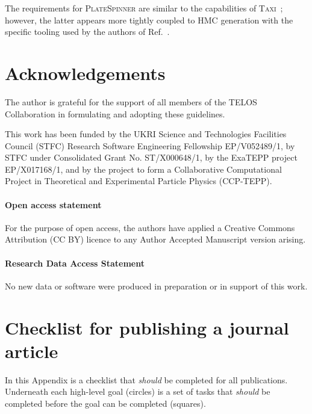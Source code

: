 \documentclass{article}
\newcommand\rfcword[1]{\emph{#1}\xspace}
\newcommand\should{\rfcword{should}}
\newcommand\program[1]{\textsc{#1}\xspace}
\begin{document}
The requirements for \program{PlateSpinner} are similar to the capabilities of \program{Taxi}~\cite{Ayyar:2018wwf};
however,
the latter appears more tightly coupled to HMC generation with
the specific tooling used by the authors of Ref.~\cite{Ayyar:2018wwf}.


\section{Acknowledgements}

The author is grateful for the support of all members of the TELOS Collaboration
in formulating and adopting these guidelines.

This work has been funded by the
UKRI Science and Technologies Facilities Council (STFC)
Research Software Engineering Fellowship EP/V052489/1,
by STFC under Consolidated Grant No. ST/X000648/1,
by the ExaTEPP project EP/X017168/1,
and by
the project to form a Collaborative Computational Project
in Theoretical and Experimental Particle Physics
(CCP-TEPP).

\paragraph*{Open access statement}
For the purpose of open access,
the authors have
applied a Creative Commons Attribution (CC BY) licence
to any Author Accepted Manuscript version arising.

\paragraph*{Research Data Access Statement}
No new data or software were produced in preparation or in support of this work.



\nocite{apsrev41Control}


\clearpage
\appendix

\section{Checklist for publishing a journal article}\label{app:checklist}

In this Appendix is a checklist that \should be completed for all publications.
Underneath each high-level goal
(circles)
is a set of tasks that \should be completed before the goal can be completed
(squares).
\end{document}
